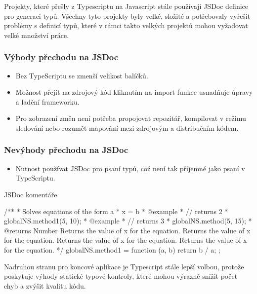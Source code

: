Projekty, které přešly z Typescriptu na Javascript stále používají JSDoc definice pro generaci typů. Všechny tyto projekty byly velké, složité a potřebovaly vyřešit problémy s definicí typů, které v rámci takto velkých projektů mohou vyžadovat velké množství práce. \cite{DitchingTypescript}

\subsubsection{Výhody přechodu na JSDoc}

\begin{itemize}
    \item Bez TypeScriptu se zmenší velikost balíčků.
    \item Možnost přejít na zdrojový kód kliknutím na import funkce usnadňuje úpravy a ladění frameworku.
    \item Pro zobrazení změn není potřeba propojovat repozitář, kompilovat v režimu sledování nebo rozumět mapování mezi zdrojovým a distribučním kódem.
\end{itemize}

\subsubsection{Nevýhody přechodu na JSDoc}

\begin{itemize}
    \item Nutnost používat JSDoc pro psaní typů, což není tak příjemné jako psaní v TypeScriptu.
\end{itemize}

\begin{listing}[H]
    \caption{JSDoc komentáře}
    \label{lst:jsdoc-example}
    \begin{code}[js]
/**
 * Solves equations of the form a * x = b
 * @example
 * // returns 2
 * globalNS.method1(5, 10);
 * @example
 * // returns 3
 * globalNS.method(5, 15);
 * @returns {Number} Returns the value of x for the equation. Returns the value of x for the equation. Returns the value of x for the equation. Returns the value of x for the equation.
 */
 globalNS.method1 = function (a, b) {
    return b / a;
};
    \end{code}
\end{listing}

Nadruhou stranu pro koncové aplikace je Typescript stále lepší volbou, protože poskytuje výhody statické typové kontroly, které mohou výrazně snížit počet chyb a zvýšit kvalitu kódu. \cite{FireshipTypescript}

